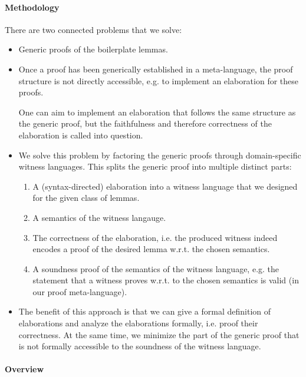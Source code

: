 \paragraph{Methodology}
There are two connected problems that we solve:
\begin{itemize}
\item Generic proofs of the boilerplate lemmas.

\item Once a proof has been generically established in a meta-language, the
  proof structure is not directly accessible, e.g. to implement an elaboration
  for these proofs.

  One can aim to implement an elaboration that follows the same structure as the
  generic proof, but the faithfulness and therefore correctness of the
  elaboration is called into question.

\item
  We solve this problem by factoring the generic proofs through domain-specific
  witness languages. This splits the generic proof into multiple distinct parts:
  \begin{enumerate}
  \item A (syntax-directed) elaboration into a witness language that we designed
    for the given class of lemmas.
  \item A semantics of the witness langauge.
  \item The correctness of the elaboration, i.e. the produced witness indeed
    encodes a proof of the desired lemma w.r.t. the chosen semantics.
  \item A soundness proof of the semantics of the witness language, e.g. the
    statement that a witness proves w.r.t. to the chosen semantics is valid (in
    our proof meta-language).
  \end{enumerate}

\item The benefit of this approach is that we can give a formal definition of
  elaborations and analyze the elaborations formally, i.e. proof their
  correctness. At the same time, we minimize the part of the generic proof that
  is not formally accessible to the soundness of the witness language.
\end{itemize}


\paragraph{Overview}

